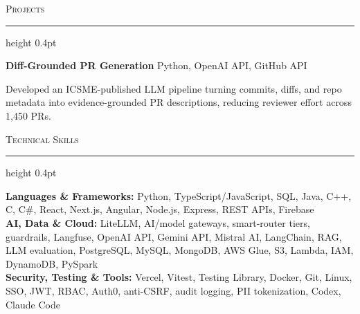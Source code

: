 \documentclass[letterpaper,11pt]{article}
\newcommand{\resumesection}[1]{%
  \par\vspace{2pt}%
  {\large\scshape #1}\par\vspace{2pt}%
  \hrule height 0.4pt\vspace{2pt}%
}
\newcommand{\projectHeading}[2]{
  \textbf{#1} \hfill #2
}
\begin{document}
\resumesection{Projects}
\projectHeading{Diff-Grounded PR Generation}{Python, OpenAI API, GitHub API}
\begin{tightitemize}
  \item Developed an ICSME-published LLM pipeline turning commits, diffs, and repo metadata into evidence-grounded PR descriptions, reducing reviewer effort across 1,450 PRs.
\end{tightitemize}

\resumesection{Technical Skills}
\textbf{Languages \& Frameworks:} Python, TypeScript/JavaScript, SQL, Java, C++, C, C\#, React, Next.js, Angular, Node.js, Express, REST APIs, Firebase\\
\textbf{AI, Data \& Cloud:} LiteLLM, AI/model gateways, smart-router tiers, guardrails, Langfuse, OpenAI API, Gemini API, Mistral AI, LangChain, RAG, LLM evaluation, PostgreSQL, MySQL, MongoDB, AWS Glue, S3, Lambda, IAM, DynamoDB, PySpark\\
\textbf{Security, Testing \& Tools:} Vercel, Vitest, Testing Library, Docker, Git, Linux, SSO, JWT, RBAC, Auth0, anti-CSRF, audit logging, PII tokenization, Codex, Claude Code
\end{document}
